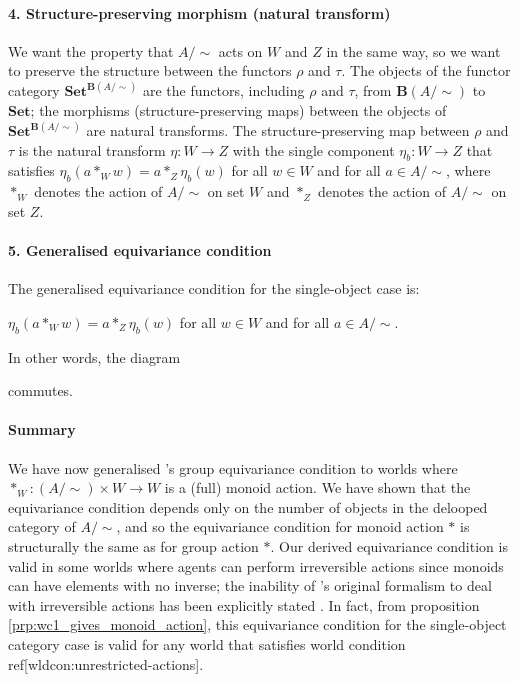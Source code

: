 \paragraph{4. Structure-preserving morphism (natural transform)}
We want the property that $A/\sim$ acts on $W$ and $Z$ in the same way, so we want to preserve the structure between the functors $\rho$ and $\tau$.
The objects of the functor category $\textbf{Set}^{\textbf{B}(A/\sim)}$ are the functors, including $\rho$ and $\tau$, from $\textbf{B}(A/\sim)$ to $\textbf{Set}$; the morphisms (structure-preserving maps) between the objects of $\textbf{Set}^{\textbf{B}(A/\sim)}$ are natural transforms.
The structure-preserving map between $\rho$ and $\tau$ is the natural transform $\eta: W \to Z$ with the single component $\eta_{b}: W \to Z$ that satisfies $\eta_{b}(a *_{W} w) = a *_{Z} \eta_{b}(w)$ for all $w \in W$ and for all $a \in A/\sim$, where $*_{W}$ denotes the action of $A/\sim$ on set $W$ and $*_{Z}$ denotes the action of $A/\sim$ on set $Z$.

\paragraph{5. Generalised equivariance condition}
The generalised equivariance condition for the single-object case is:
\begin{center}
    $\eta_{b}(a *_{W} w) = a *_{Z} \eta_{b}(w)$ for all $w \in W$ and for all $a \in A/\sim$.
\end{center}
In other words, the diagram

commutes.

\paragraph{Summary}
We have now generalised \autocite{Higgins2018}'s group equivariance condition to worlds where $*_{W}: (A/\sim) \times W \to W$ is a (full) monoid action.
We have shown that the equivariance condition depends only on the number of objects in the delooped category of $A/\sim$, and so the equivariance condition for monoid action $*$ is structurally the same as for group action $*$.
Our derived equivariance condition is valid in some worlds where agents can perform irreversible actions since monoids can have elements with no inverse; the inability of \autocite{Higgins2018}'s original formalism to deal with irreversible actions has been explicitly stated \cite[page 4]{caselles2019symmetry}.
In fact, from proposition \ref{prp:wc1_gives_monoid_action}, this equivariance condition for the single-object category case is valid for any world that satisfies world condition ref[wldcon:unrestricted-actions].


